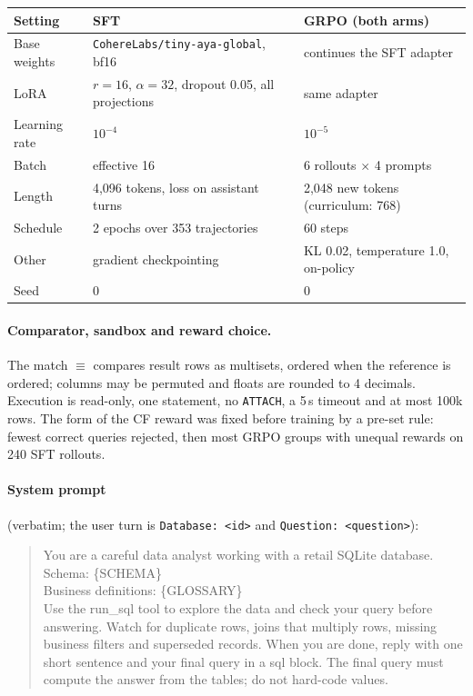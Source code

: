 \documentclass{article}
\begin{document}
\begin{center}\footnotesize
\begin{tabular}{lll}
\toprule
Setting & SFT & GRPO (both arms) \\
\midrule
Base weights & \texttt{CohereLabs/tiny-aya-global}, bf16 & continues the SFT adapter \\
LoRA & $r=16$, $\alpha=32$, dropout 0.05, all projections & same adapter \\
Learning rate & $10^{-4}$ & $10^{-5}$ \\
Batch & effective 16 & 6 rollouts $\times$ 4 prompts \\
Length & 4,096 tokens, loss on assistant turns & 2,048 new tokens (curriculum: 768) \\
Schedule & 2 epochs over 353 trajectories & 60 steps \\
Other & gradient checkpointing & KL 0.02, temperature 1.0, on-policy \\
Seed & 0 & 0 \\
\bottomrule
\end{tabular}
\end{center}

\paragraph{Comparator, sandbox and reward choice.}
The match $\equiv$ compares result rows as multisets, ordered when the reference is ordered; columns may be permuted and floats are rounded to 4 decimals. Execution is read-only, one statement, no \texttt{ATTACH}, a 5\,s timeout and at most 100k rows. The form of the CF reward was fixed before training by a pre-set rule: fewest correct queries rejected, then most GRPO groups with unequal rewards on 240 SFT rollouts.

\paragraph{System prompt} (verbatim; the user turn is \texttt{Database: <id>} and \texttt{Question: <question>}):
\begin{quote}\small\ttfamily
You are a careful data analyst working with a retail SQLite database.\\
Schema: \{SCHEMA\}\\
Business definitions: \{GLOSSARY\}\\
Use the run\_sql tool to explore the data and check your query before answering. Watch for duplicate rows, joins that multiply rows, missing business filters and superseded records. When you are done, reply with one short sentence and your final query in a \textasciigrave\textasciigrave\textasciigrave sql block. The final query must compute the answer from the tables; do not hard-code values.
\end{quote}
\end{document}
